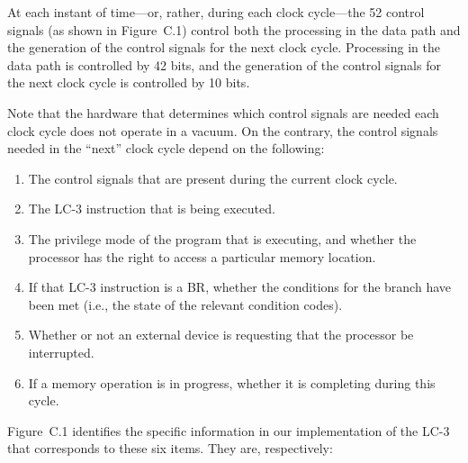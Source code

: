 \documentclass{patt}
\begin{document}
At each instant of time---or, rather, during each clock cycle---the 52
control signals (as shown in Figure~C.1) control both the processing
in the data path and the generation of the control signals for the
next clock cycle. Processing in the data path is controlled by 42
bits, and the generation of the control signals for the next clock
cycle is controlled by 10 bits.

Note that the hardware that determines which control signals are
needed each clock cycle does not operate in a vacuum.  On the
contrary, the control signals needed in the ``next'' clock cycle
depend on the following:

\bgroup

\begin{enumerate}
\item %
  The control signals that are present during the current clock cycle. 

\item %
  The LC-3 instruction that is being executed.

\item %
  The privilege mode of the program that is executing, and whether the
  processor has the right to access a particular memory location.

\item %
  If that LC-3 instruction is a BR, whether the conditions for the
  branch have been met (i.e., the state of the relevant condition
  codes).

\item %
  Whether or not an external device is requesting that the processor
  be interrupted.

\item %
  If a memory operation is in progress, whether it is completing
  during this cycle.
\end{enumerate}
\egroup

Figure~C.1 identifies the specific information in our implementation
of the LC-3 that corresponds to these six items.  They are,
respectively:
\end{document}
